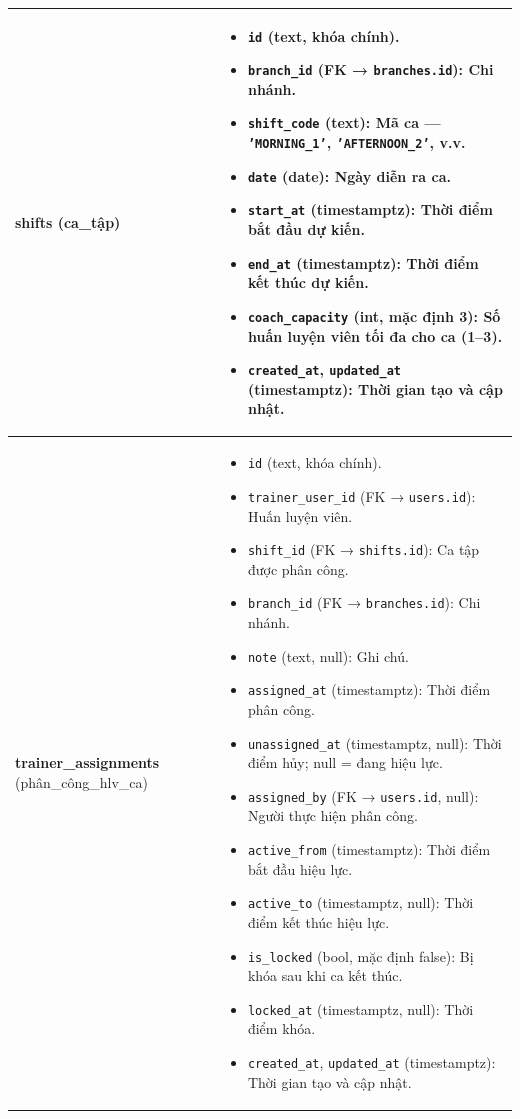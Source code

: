 \begin{longtable}{|>{\centering\arraybackslash}m{4.5cm}|>{\raggedright\arraybackslash}m{11.5cm}|}
\textbf{shifts} \newline (ca\_tập) &
\begin{itemize}
    \item \texttt{id} (text, khóa chính).
    \item \texttt{branch\_id} (FK → \texttt{branches.id}): Chi nhánh.
    \item \texttt{shift\_code} (text): Mã ca — \texttt{'MORNING\_1'}, \texttt{'AFTERNOON\_2'}, v.v.
    \item \texttt{date} (date): Ngày diễn ra ca.
    \item \texttt{start\_at} (timestamptz): Thời điểm bắt đầu dự kiến.
    \item \texttt{end\_at} (timestamptz): Thời điểm kết thúc dự kiến.
    \item \texttt{coach\_capacity} (int, mặc định 3): Số huấn luyện viên tối đa cho ca (1–3).
    \item \texttt{created\_at}, \texttt{updated\_at} (timestamptz): Thời gian tạo và cập nhật.
\end{itemize} \\ \hline

\textbf{trainer\_assignments} \newline (phân\_công\_hlv\_ca) &
\begin{itemize}
    \item \texttt{id} (text, khóa chính).
    \item \texttt{trainer\_user\_id} (FK → \texttt{users.id}): Huấn luyện viên.
    \item \texttt{shift\_id} (FK → \texttt{shifts.id}): Ca tập được phân công.
    \item \texttt{branch\_id} (FK → \texttt{branches.id}): Chi nhánh.
    \item \texttt{note} (text, null): Ghi chú.
    \item \texttt{assigned\_at} (timestamptz): Thời điểm phân công.
    \item \texttt{unassigned\_at} (timestamptz, null): Thời điểm hủy; null = đang hiệu lực.
    \item \texttt{assigned\_by} (FK → \texttt{users.id}, null): Người thực hiện phân công.
    \item \texttt{active\_from} (timestamptz): Thời điểm bắt đầu hiệu lực.
    \item \texttt{active\_to} (timestamptz, null): Thời điểm kết thúc hiệu lực.
    \item \texttt{is\_locked} (bool, mặc định false): Bị khóa sau khi ca kết thúc.
    \item \texttt{locked\_at} (timestamptz, null): Thời điểm khóa.
    \item \texttt{created\_at}, \texttt{updated\_at} (timestamptz): Thời gian tạo và cập nhật.
\end{itemize} \\ \hline


\end{longtable}
